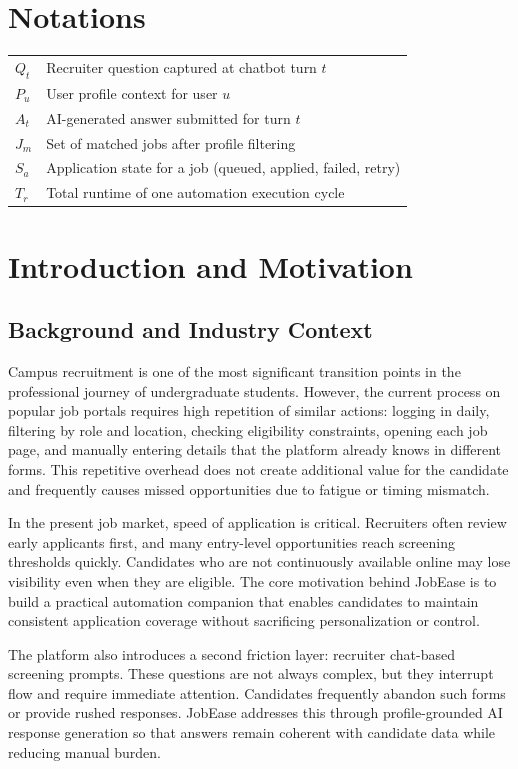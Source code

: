 \documentclass[12pt,a4paper,oneside]{report}
\begin{document}
\chapter*{Notations}
\begin{longtable}{p{}p{}}
$Q_t$ & Recruiter question captured at chatbot turn $t$ \\
$P_u$ & User profile context for user $u$ \\
$A_t$ & AI-generated answer submitted for turn $t$ \\
$J_m$ & Set of matched jobs after profile filtering \\
$S_a$ & Application state for a job (queued, applied, failed, retry) \\
$T_r$ & Total runtime of one automation execution cycle \\
\end{longtable}


\chapter{Introduction and Motivation}
\section{Background and Industry Context}
Campus recruitment is one of the most significant transition points in the professional journey of undergraduate students. However, the current process on popular job portals requires high repetition of similar actions: logging in daily, filtering by role and location, checking eligibility constraints, opening each job page, and manually entering details that the platform already knows in different forms. This repetitive overhead does not create additional value for the candidate and frequently causes missed opportunities due to fatigue or timing mismatch.

In the present job market, speed of application is critical. Recruiters often review early applicants first, and many entry-level opportunities reach screening thresholds quickly. Candidates who are not continuously available online may lose visibility even when they are eligible. The core motivation behind JobEase is to build a practical automation companion that enables candidates to maintain consistent application coverage without sacrificing personalization or control.

The platform also introduces a second friction layer: recruiter chat-based screening prompts. These questions are not always complex, but they interrupt flow and require immediate attention. Candidates frequently abandon such forms or provide rushed responses. JobEase addresses this through profile-grounded AI response generation so that answers remain coherent with candidate data while reducing manual burden.
\end{document}
